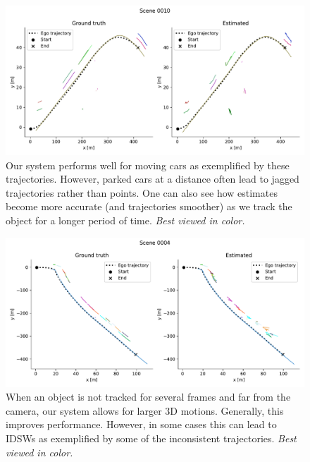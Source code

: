 \documentclass[headsepline, hidelinks, footsepline, footinclude=false, oneside, fontsize=11pt, paper=a4, listof=totoc, bibliography=totoc]{scrbook}
\begin{document}
\begin{figure}[htbp]
\centering
\includegraphics[width=.9\linewidth]{figures/trajs_10.pdf}
\caption{\label{fig:trajs-10}Our system performs well for moving cars as exemplified by these trajectories. However, parked cars at a distance often lead to jagged trajectories rather than points. One can also see how estimates become more accurate (and trajectories smoother) as we track the object for a longer period of time. \emph{Best viewed in color.}}
\end{figure}

\begin{figure}[htbp]
\centering
\includegraphics[width=.9\linewidth]{figures/trajs_4.pdf}
\caption{\label{fig:trajs-4}When an object is not tracked for several frames and far from the camera, our system allows for larger 3D motions. Generally, this improves performance. However, in some cases this can lead to IDSWs as exemplified by some of the inconsistent trajectories. \emph{Best viewed in color.}}
\end{figure}
\end{document}
